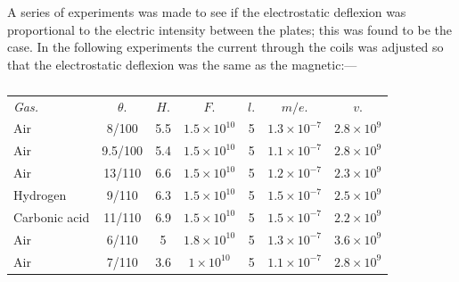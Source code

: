 A series of experiments was made to see if the electrostatic deflexion
was proportional to the electric intensity between the plates; this was
found to be the case. In the following experiments the current through
the coils was adjusted so that the electrostatic deflexion was the same
as the magnetic:---
\begin{table}[htp]
\caption{}
\label{tbl:thomson_1}
\centering
\begin{tabular}{l*{6}{c}} %
\toprule
\addlinespace[2pt]
\emph{Gas.} & $\theta.$ & $H.$ & $F.$ & $l.$ & $m/e.$ & $v.$\\
\cmidrule(lr){1-1}\cmidrule(lr){2-2}\cmidrule(lr){3-3}\cmidrule(lr){4-4}\cmidrule(lr){5-5}\cmidrule(lr){6-6}\cmidrule(lr){7-7}
\addlinespace[2pt]
Air           & 8/100   & 5.5 & $1.5\!\times\!{10^{10}}$ & 5 & $1.3\!\times\!{10^{-7}}$ & $2.8\!\times\!{10^9}$\\
Air           & 9.5/100 & 5.4 & $1.5\!\times\!{10^{10}}$ & 5 & $1.1\!\times\!{10^{-7}}$ & $2.8\!\times\!{10^9}$\\
Air           & 13/110  & 6.6 & $1.5\!\times\!{10^{10}}$ & 5 & $1.2\!\times\!{10^{-7}}$ & $2.3\!\times\!{10^9}$\\
Hydrogen      & 9/110   & 6.3 & $1.5\!\times\!{10^{10}}$ & 5 & $1.5\!\times\!{10^{-7}}$ & $2.5\!\times\!{10^9}$\\
Carbonic acid & 11/110  & 6.9 & $1.5\!\times\!{10^{10}}$ & 5 & $1.5\!\times\!{10^{-7}}$ & $2.2\!\times\!{10^9}$\\
Air           & 6/110   & 5   & $1.8\!\times\!{10^{10}}$ & 5 & $1.3\!\times\!{10^{-7}}$ & $3.6\!\times\!{10^9}$\\
Air           & 7/110   & 3.6 & $1\!\times\!{10^{10}}$   & 5 & $1.1\!\times\!{10^{-7}}$ & $2.8\!\times\!{10^9}$\\
\bottomrule
\end{tabular}
\end{table}

